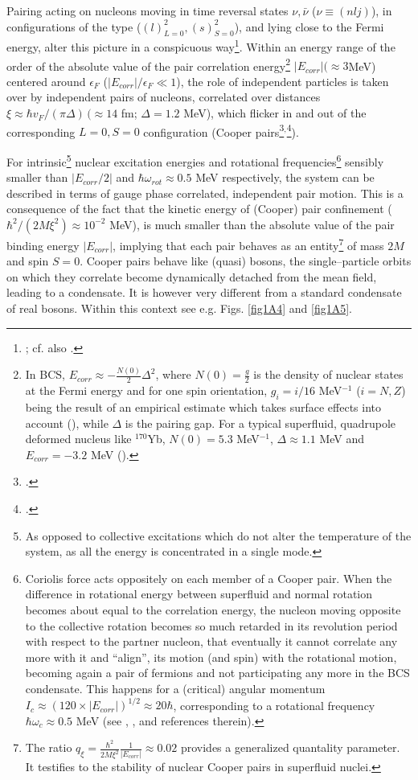 Pairing acting on nucleons moving in time reversal states $\nu,\bar\nu$ ($\nu\equiv(nlj)$), in configurations of the type ($(l)^2_{L=0},(s)^2_{S=0}$), and lying close to the Fermi energy, alter this picture in a conspicuous way\footnote{\cite{Bohr:58}; cf. also \cite{Broglia:13}.}. Within an energy range of the order of the absolute value of the pair correlation energy\footnote{In BCS, $E_{corr}\approx-\frac{N(0)}{2}\Delta^2$, where $N(0)=\frac{g}{2}$ is the density of nuclear states at the Fermi energy and for one spin orientation, $g_i=i/16$ MeV$^{-1}$ ($i=N,Z$) being the result of an empirical estimate which takes surface effects into account (\cite{Bohr:75,Bortignon:98}), while $\Delta$ is the pairing gap. For a typical superfluid, quadrupole deformed nucleus like $^{170}$Yb, $N(0)=5.3$ MeV$^{-1}$, $\Delta\approx1.1$ MeV and $E_{corr}=-3.2$ MeV (\cite{Shimizu:89}).} $|E_{corr}|(\approx 3 $MeV) centered around $\epsilon_F$ ($|E_{corr}|/\epsilon_F\ll1$), the role of independent particles is taken over by independent pairs of nucleons, correlated over distances $\xi\approx\hbar v_F/(\pi\Delta)\,(\approx 14$ fm; $\Delta=1.2$ MeV), which flicker in and out of the corresponding $L=0, S=0$ configuration (Cooper pairs\footnote{\cite{Cooper:56}.}$^{,}$\footnote{\cite{Brink:05}.}).


For intrinsic\footnote{As opposed to collective excitations which do not alter the temperature of the system, as all the energy is concentrated in a single mode.} nuclear excitation energies and rotational frequencies\footnote{Coriolis force acts oppositely on each member of a Cooper pair. When the difference in rotational energy between superfluid and normal rotation becomes about equal to the correlation energy, the nucleon moving opposite to the collective rotation becomes so much retarded in its revolution period with respect to the partner nucleon, that eventually it cannot correlate any more with it and ``align'', its motion (and spin) with the rotational motion, becoming again a pair of fermions and not participating any more in the BCS  condensate. This happens for a (critical) angular momentum $I_c\approx(120\times|E_{corr}|)^{1/2}\approx 20\hbar$, corresponding to a rotational frequency $\hbar\omega_c\approx 0.5$ MeV (see \cite{Bohr:75}, \cite{Brink:05}, \cite{Broglia:13} and references therein).} sensibly smaller than $|E_{corr}/2|$ and $\hbar\omega_{rot}\approx0.5$ MeV respectively, the system can be described in terms of gauge phase correlated, independent pair motion. This is a consequence of the fact that the kinetic energy of (Cooper) pair confinement ($\hbar^2/(2M\xi^2)\approx 10^{-2}$ MeV), is much smaller than the absolute value of the pair binding energy $|E_{corr}|$, implying that each pair behaves as an entity\footnote{The ratio $q_\xi=\frac{\hbar^2}{2M\xi^2}\frac{1}{|E_{corr}|}\approx 0.02$ provides a generalized quantality parameter. It testifies to the stability of nuclear Cooper pairs in superfluid nuclei.} of mass $2M$ and spin $S=0$. Cooper pairs behave like (quasi) bosons, the single--particle orbits on which they correlate become dynamically detached from the mean field, leading to a condensate. It is however very different from a standard condensate of real bosons. Within this context see e.g. Figs. \ref{fig1A4} and \ref{fig1A5}.

